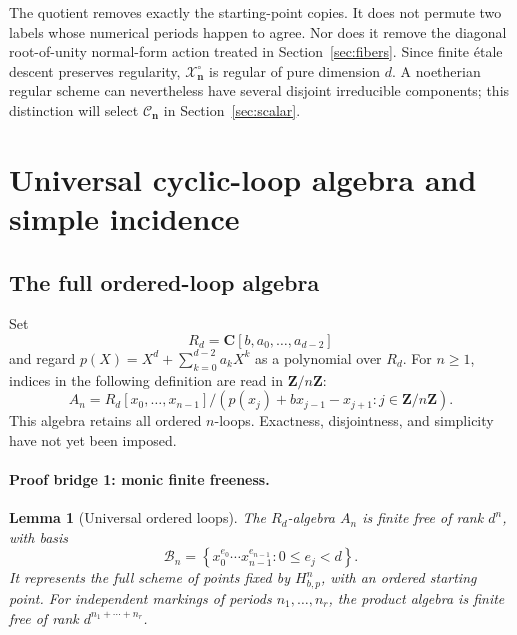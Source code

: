 \documentclass[11pt]{article}
\newtheorem{lemma}[theorem]{Lemma}
\theoremstyle{definition}
\theoremstyle{remark}
\newcommand{\C}{\mathbf C}
\newcommand{\Z}{\mathbf Z}
\newcommand{\cC}{\mathcal C}
\newcommand{\cX}{\mathcal X}
\newcommand{\bn}{\mathbf n}
\begin{document}
The quotient removes exactly the starting-point copies.  It does not
permute two labels whose numerical periods happen to agree.  Nor does it
remove the diagonal root-of-unity normal-form action treated in
Section~\ref{sec:fibers}.  Since finite étale descent preserves regularity,
$\cX_{\bn}^{\circ}$ is regular of pure dimension $d$.  A noetherian regular
scheme can nevertheless have several disjoint irreducible components; this
distinction will select $\cC_{\bn}$ in Section~\ref{sec:scalar}.

\section{Universal cyclic-loop algebra and simple incidence}
\label{sec:loops}

\subsection{The full ordered-loop algebra}

Set
\[
  R_d=\C[b,a_0,\ldots,a_{d-2}]
\]
and regard
$p(X)=X^d+\sum_{k=0}^{d-2}a_kX^k$ as a polynomial over $R_d$.  For
$n\geq1$, indices in the following definition are read in $\Z/n\Z$:
\[
  A_n
  =
  R_d[x_0,\ldots,x_{n-1}]
  \big/
  \left(
    p(x_j)+b x_{j-1}-x_{j+1}:j\in\Z/n\Z
  \right).
\]
This algebra retains all ordered $n$-loops.  Exactness, disjointness, and
simplicity have not yet been imposed.

\paragraph{Proof bridge 1: monic finite freeness.}

\begin{lemma}[Universal ordered loops]
\label{lem:finite-free}
The $R_d$-algebra $A_n$ is finite free of rank $d^n$, with basis
\[
  \mathcal B_n
  =
  \left\{
    x_0^{e_0}\cdots x_{n-1}^{e_{n-1}}:
    0\leq e_j<d
  \right\}.
\]
It represents the full scheme of points fixed by $H_{b,p}^n$, with an
ordered starting point.  For independent markings of periods
$n_1,\ldots,n_r$, the product algebra is finite free of rank
$d^{n_1+\cdots+n_r}$.
\end{lemma}
\end{document}

